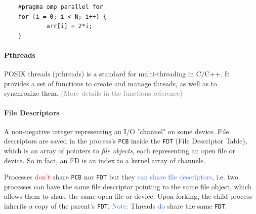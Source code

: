 \documentclass[openany,12pt]{book}
\newcommand{\code}[1]{\texttt{#1}}
\newcommand{\red}[1]{\textcolor{Red}{#1}}
\newcommand{\blue}[1]{\textcolor{RoyalBlue}{#1}}
\newcommand{\gray}[1]{\textcolor{gray}{#1}}
\begin{document}
\begin{center}
  \begin{minipage}{0.9\textwidth}
    \begin{lstlisting}
    #pragma omp parallel for
    for (i = 0; i < N; i++) {
            arr[i] = 2*i;
    } \end{lstlisting}
  \end{minipage}
\end{center}


\paragraph{Pthreads} POSIX threads (pthreads) is a standard for multi-threading in C/C++. It provides a set of functions to create and manage threads, as well as to synchronize them. \gray{(More details in the functions reference)}



\paragraph{File Descriptors} A non-negative integer representing an I/O "channel" on some device. File descriptors are saved in the process's \code{PCB} inside the \code{FDT} (File Descriptor Table), which is an array of pointers to \textit{file objects}, each representing an open file or device. So in fact, an FD is an index to a kernel array of channels.

Processes \red{don't} share \code{PCB} nor \code{FDT} but they \blue{can share file descriptors}, i.e. two processes can have the same file descriptor pointing to the same file object, which allows them to share the same open file or device. Upon forking, the child process inherits a copy of the parent's \code{FDT}. \blue{Note:} Threads \blue{do} share the same \code{FDT}.
\end{document}
